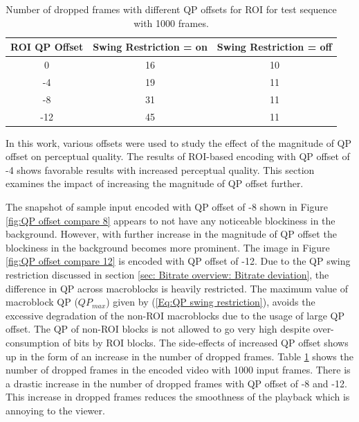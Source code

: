\documentclass[11pt]{article} %
\begin{document}
\begin{table} [h!]
	\centering
	\begin{tabular}{ |c|c|c| }
		\hline
		\textbf{ROI QP Offset} & \textbf{Swing Restriction = on} & \textbf{Swing Restriction = off} \\
		\hline 
		0 & 16 & 10  \\
		\hline
		-4 & 19 & 11  \\
		\hline
		-8 & 31 & 11 \\ 
		\hline
		-12 & 45 & 11 \\ 
		\hline						
	\end{tabular}
	\caption{Number of dropped frames with different QP offsets for ROI for test sequence with 1000 frames.}
	\label{Table:QP tuning dropped frames}
\end{table}

In this work, various offsets were used to study the effect of the magnitude of QP offset on perceptual quality. The results of ROI-based encoding with QP offset of -4 shows favorable results with increased perceptual quality. This section examines the impact of increasing the magnitude of QP offset further. %

The snapshot of sample input encoded  with QP offset of -8 shown in Figure \ref{fig:QP offset compare 8} appears to not have any noticeable blockiness in the background. However, with further increase in the magnitude of QP offset the blockiness in the background becomes more prominent. The image in Figure \ref{fig:QP offset compare 12} is encoded with QP offset of -12. Due to the QP swing restriction discussed in section \ref{sec: Bitrate overview: Bitrate deviation}, the difference in QP across macroblocks is heavily restricted. The maximum value of macroblock QP ($QP_{max}$) given by (\ref{Eq:QP swing restriction}), avoids the excessive degradation of the non-ROI macroblocks due to the usage of large QP offset. The QP of non-ROI blocks is not allowed to go very high despite over-consumption of bits by ROI blocks.  The side-effects of increased QP offset shows up in the form of an increase in the number of dropped frames. Table \ref{Table:QP tuning dropped frames} shows the number of dropped frames in the encoded video with 1000 input frames. There is a drastic increase in the number of dropped frames with QP offset of -8 and -12. This increase in dropped frames reduces the smoothness of the playback which is annoying to the viewer.
\end{document}

